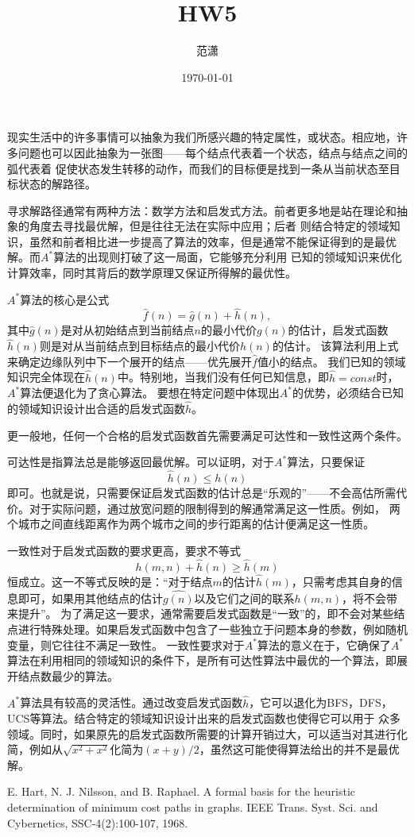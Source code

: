 \documentclass[a4paper]{article}
\title{HW5}
\author{范潇\quad 2254298}
\date{\today}
\begin{document}
\maketitle
现实生活中的许多事情可以抽象为我们所感兴趣的特定属性，或状态。相应地，许多问题也可以因此抽象为一张图——每个结点代表着一个状态，结点与结点之间的弧代表着
促使状态发生转移的动作，而我们的目标便是找到一条从当前状态至目标状态的解路径。

寻求解路径通常有两种方法：数学方法和启发式方法。\cite{ref1}前者更多地是站在理论和抽象的角度去寻找最优解，但是往往无法在实际中应用；后者
则结合特定的领域知识，虽然和前者相比进一步提高了算法的效率，但是通常不能保证得到的是最优解。而$A^*$算法的出现则打破了这一局面，它能够充分利用
已知的领域知识来优化计算效率，同时其背后的数学原理又保证所得解的最优性。

$A^*$算法的核心是公式
\[\hat{f}(n)=\hat{g}(n)+\hat{h}(n),\]
其中$\hat{g}(n)$是对从初始结点到当前结点$n$的最小代价$g(n)$的估计，启发式函数$\hat{h}(n)$则是对从当前结点到目标结点的最小代价$h(n)$的估计。
该算法利用上式来确定边缘队列中下一个展开的结点——优先展开$\hat{f}$值小的结点。
我们已知的领域知识完全体现在$\hat{h}(n)$中。特别地，当我们没有任何已知信息，即$\hat{h}=const$时，$A^*$算法便退化为了贪心算法。
要想在特定问题中体现出$A^*$的优势，必须结合已知的领域知识设计出合适的启发式函数$\hat{h}$。

更一般地，任何一个合格的启发式函数首先需要满足可达性和一致性这两个条件。

可达性是指算法总是能够返回最优解。可以证明，对于$A^*$算法，只要保证
\[\hat{h}(n)\leq h(n)\]
即可。也就是说，只需要保证启发式函数的估计总是“乐观的”——不会高估所需代价。对于实际问题，通过放宽问题的限制得到的解通常满足这一性质。例如，
两个城市之间直线距离作为两个城市之间的步行距离的估计便满足这一性质。

一致性对于启发式函数的要求更高，要求不等式
\[h(m,n)+\hat{h}(n)\geq\hat{h}(m)\]
恒成立。这一不等式反映的是：“对于结点$m$的估计$\hat{h}(m)$，只需考虑其自身的信息即可，如果用其他结点的估计$\hat{g(n)}$以及它们之间的联系$h(m,n)$，将不会带来提升”。
为了满足这一要求，通常需要启发式函数是“一致”的，即不会对某些结点进行特殊处理。如果启发式函数中包含了一些独立于问题本身的参数，例如随机变量，则它往往不满足一致性。\cite{ref1}
一致性要求对于$A^*$算法的意义在于，它确保了$A^*$算法在利用相同的领域知识的条件下，是所有可达性算法中最优的一个算法，即展开结点数最少的算法。

$A^*$算法具有较高的灵活性。通过改变启发式函数$\hat{h}$，它可以退化为BFS，DFS，UCS等算法。结合特定的领域知识设计出来的启发式函数也使得它可以用于
众多领域。同时，如果原先的启发式函数所需要的计算开销过大，可以适当对其进行化简，例如从$\sqrt{x^2+x^2}$化简为$(x+y)/2$，虽然这可能使得算法给出的并不是最优解。
\begin{thebibliography}{99}
E. Hart, N. J. Nilsson, and B. Raphael. A formal basis for the heuristic determination of minimum cost paths in graphs. IEEE Trans. Syst. Sci. and Cybernetics, SSC-4(2):100-107, 1968.
\end{thebibliography}
\end{document}
